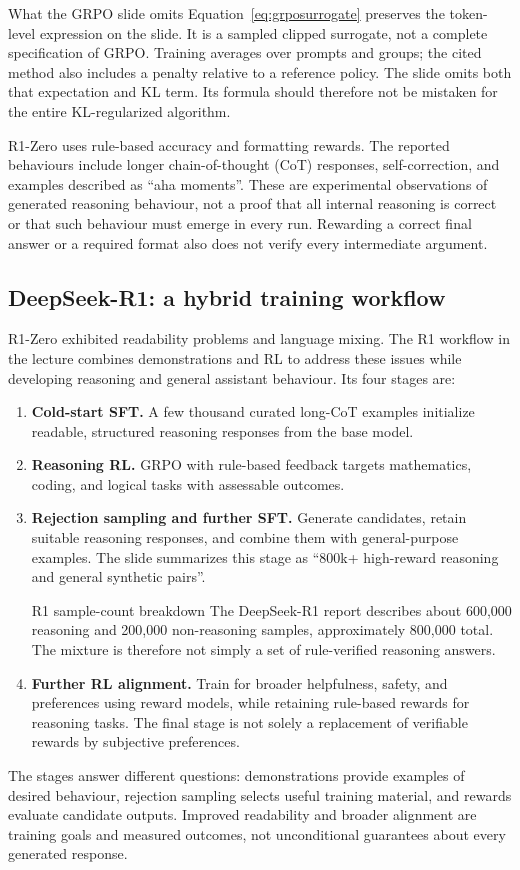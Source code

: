 \documentclass[11pt,a4paper]{article}
\numberwithin{equation}{section}
\numberwithin{figure}{section}
\numberwithin{table}{section}
\begin{document}
\begin{supplementary}{What the GRPO slide omits}
Equation~\eqref{eq:grposurrogate} preserves the token-level expression on the slide. It is a sampled clipped surrogate, not a complete specification of GRPO. Training averages over prompts and groups; the cited method also includes a penalty relative to a reference policy. The slide omits both that expectation and KL term. Its formula should therefore not be mistaken for the entire KL-regularized algorithm.
\end{supplementary}

R1-Zero uses rule-based accuracy and formatting rewards. The reported behaviours include longer chain-of-thought (CoT) responses, self-correction, and examples described as ``aha moments''. These are experimental observations of generated reasoning behaviour, not a proof that all internal reasoning is correct or that such behaviour must emerge in every run. Rewarding a correct final answer or a required format also does not verify every intermediate argument.

\subsection{DeepSeek-R1: a hybrid training workflow}\label{sec:r1}
R1-Zero exhibited readability problems and language mixing. The R1 workflow in the lecture combines demonstrations and RL to address these issues while developing reasoning and general assistant behaviour. Its four stages are:
\begin{enumerate}
\item \textbf{Cold-start SFT.} A few thousand curated long-CoT examples initialize readable, structured reasoning responses from the base model.
\item \textbf{Reasoning RL.} GRPO with rule-based feedback targets mathematics, coding, and logical tasks with assessable outcomes.
\item \textbf{Rejection sampling and further SFT.} Generate candidates, retain suitable reasoning responses, and combine them with general-purpose examples. The slide summarizes this stage as ``800k+ high-reward reasoning and general synthetic pairs''.\par
\begin{supplementary}{R1 sample-count breakdown}
The DeepSeek-R1 report describes about 600,000 reasoning and 200,000 non-reasoning samples, approximately 800,000 total. The mixture is therefore not simply a set of rule-verified reasoning answers.
\end{supplementary}
\item \textbf{Further RL alignment.} Train for broader helpfulness, safety, and preferences using reward models, while retaining rule-based rewards for reasoning tasks. The final stage is not solely a replacement of verifiable rewards by subjective preferences.
\end{enumerate}
The stages answer different questions: demonstrations provide examples of desired behaviour, rejection sampling selects useful training material, and rewards evaluate candidate outputs. Improved readability and broader alignment are training goals and measured outcomes, not unconditional guarantees about every generated response.
\end{document}
